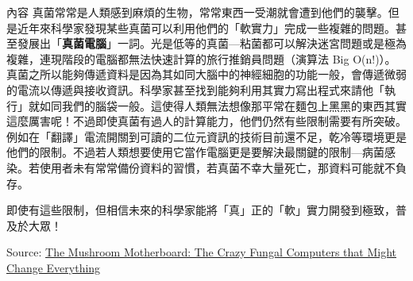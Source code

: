 \documentclass{article}
\begin{document}
\begin{boxpar}[Bittersweet]{內容}
真菌常常是人類感到麻煩的生物，常常東西一受潮就會遭到他們的襲擊。但是近年來科學家發現某些真菌可以利用他們的「軟實力」完成一些複雜的問題。甚至發展出「\textbf{真菌電腦}」一詞。光是低等的真菌—粘菌都可以解決迷宮問題或是極為複雜，連現階段的電腦都無法快速計算的旅行推銷員問題（演算法 Big O(n!)）。真菌之所以能夠傳遞資料是因為其如同大腦中的神經細胞的功能一般，會傳遞微弱的電流以傳遞與接收資訊。科學家甚至找到能夠利用其實力寫出程式來請他「執行」就如同我們的腦袋一般。這使得人類無法想像那平常在麵包上黑黑的東西其實這麼厲害呢！不過即使真菌有過人的計算能力，他們仍然有些限制需要有所突破。例如在「翻譯」電流開關到可讀的二位元資訊的技術目前還不足，乾冷等環境更是他們的限制。不過若人類想要使用它當作電腦更是要解決最關鍵的限制—病菌感染。若使用者未有常常備份資料的習慣，若真菌不幸大量死亡，那資料可能就不負存。

即使有這些限制，但相信未來的科學家能將「真」正的「軟」實力開發到極致，普及於大眾！

Source: \href{https://www.youtube.com/watch?v=5mIWo6dgTmI}{The Mushroom Motherboard: The Crazy Fungal Computers that Might Change Everything}
\end{boxpar}
\end{document}
